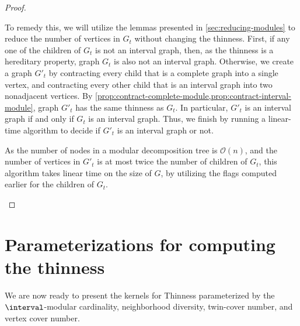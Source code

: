 \documentclass[11pt]{article}
\theoremstyle{plain}
\theoremstyle{definition}
\theoremstyle{remark}
\renewcommand{\O}{\mathcal{O}}
\begin{document}
\begin{proof}
\begin{itemize}
        To remedy this, we will utilize the lemmas presented in \cref{sec:reducing-modules} to reduce the number of vertices in $G_t$ without changing the thinness. First, if any one of the children of $G_t$ is not an interval graph, then, as the thinness is a hereditary property, graph $G_t$ is also not an interval graph. Otherwise, we create a graph $G'_t$ by contracting every child that is a complete graph into a single vertex, and contracting every other child that is an interval graph into two nonadjacent vertices. By \cref{prop:contract-complete-module,prop:contract-interval-module}, graph $G'_t$ has the same thinness as $G_t$. In particular, $G'_t$ is an interval graph if and only if $G_t$ is an interval graph. Thus, we finish by running a linear-time algorithm to decide if $G'_t$ is an interval graph or not.

        As the number of nodes in a modular decomposition tree is $\O(n)$, and the number of vertices in $G'_t$ is at most twice the number of children of $G_t$, this algorithm takes linear time on the size of $G$, by utilizing the flags computed earlier for the children of $G_t$.\qedhere
     \end{itemize}
\end{proof}

\section{Parameterizations for computing the thinness}\label{sec:parameterizations}

We are now ready to present the kernels for {\sc Thinness} parameterized by the $\interval$-modular cardinality, neighborhood diversity, twin-cover number, and vertex cover number.
\end{document}

